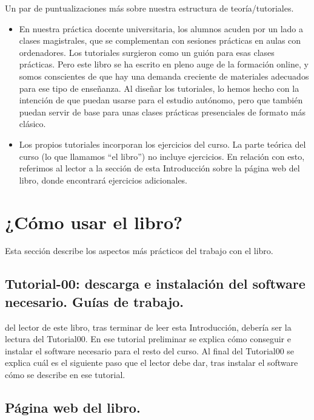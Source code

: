 Un par de puntualizaciones más sobre nuestra estructura de teoría/tutoriales.
\begin{itemize}
  \item En nuestra práctica docente universitaria, los alumnos acuden por un lado a clases magistrales, que se complementan con sesiones prácticas en aulas con ordenadores. Los tutoriales surgieron como un guión para esas clases prácticas. Pero este libro se ha escrito en pleno auge de la formación online, y somos conscientes de que hay una demanda creciente de materiales adecuados para ese tipo de enseñanza. Al diseñar los tutoriales, lo hemos hecho con la intención de que puedan usarse para el estudio autónomo, pero que también puedan servir de base para unas clases prácticas presenciales de formato más clásico.

  \item Los propios tutoriales incorporan los ejercicios del curso. La parte teórica del curso (lo que llamamos ``el libro'') no incluye ejercicios. En relación con esto, referimos al lector a la sección de esta Introducción sobre la página web del libro, donde encontrará ejercicios adicionales.
\end{itemize}

\pagebreak
\section*{¿Cómo usar el libro?}
\label{prefacio:sec:ComoUsar}

\noindent Esta sección describe los aspectos más prácticos del trabajo con el libro.

\subsection*{Tutorial-00: descarga e instalación del software necesario. Guías de trabajo.}

 del lector de este libro, tras terminar de leer esta Introducción, debería ser la lectura del Tutorial00. En ese tutorial preliminar se explica cómo conseguir e instalar el software necesario para el resto del curso. Al final del Tutorial00 se explica cuál es el siguiente paso que el lector debe dar, tras instalar el software cómo se describe en ese tutorial.


\subsection*{Página web del libro.}
\label{prefacio:subsec:PaginaWebDelCurso}

